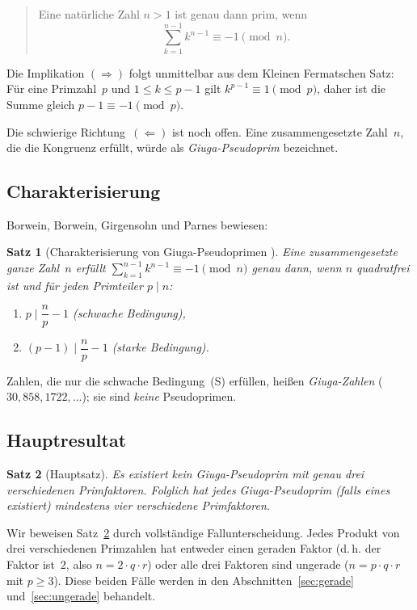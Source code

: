 \documentclass[12pt,a4paper]{amsart}
\newtheorem{theorem}{Satz}[section]
\theoremstyle{definition}
\begin{document}
\begin{quote}
  Eine natürliche Zahl $n > 1$ ist genau dann prim, wenn
  \[
    \sum_{k=1}^{n-1} k^{n-1} \equiv -1 \pmod{n}.
  \]
\end{quote}

Die Implikation $({\Rightarrow})$ folgt unmittelbar aus dem Kleinen Fermatschen Satz:
Für eine Primzahl~$p$ und $1 \le k \le p-1$ gilt $k^{p-1} \equiv 1 \pmod{p}$,
daher ist die Summe gleich $p - 1 \equiv -1 \pmod{p}$.

Die schwierige Richtung~$({\Leftarrow})$ ist noch offen. Eine zusammengesetzte Zahl~$n$,
die die Kongruenz erfüllt, würde als \emph{Giuga-Pseudoprim} bezeichnet.

\subsection{Charakterisierung}

Borwein, Borwein, Girgensohn und Parnes \cite{Borwein1996} bewiesen:

\begin{theorem}[Charakterisierung von Giuga-Pseudoprimen {\cite{Borwein1996}}]
\label{thm:char}
Eine zusammengesetzte ganze Zahl~$n$ erfüllt $\sum_{k=1}^{n-1} k^{n-1} \equiv -1 \pmod{n}$
genau dann, wenn $n$ quadratfrei ist und für jeden Primteiler $p \mid n$:
\begin{enumerate}
  \item[\textup{(S)}] $p \mid \dfrac{n}{p} - 1$  \quad\emph{(schwache Bedingung)},
  \item[\textup{(St)}] $(p-1) \mid \dfrac{n}{p} - 1$ \quad\emph{(starke Bedingung)}.
\end{enumerate}
\end{theorem}

Zahlen, die nur die schwache Bedingung~(S) erfüllen, heißen \emph{Giuga-Zahlen}
($30, 858, 1722, \ldots$); sie sind \emph{keine} Pseudoprimen.

\subsection{Hauptresultat}

\begin{theorem}[Hauptsatz]
\label{thm:haupt}
Es existiert kein Giuga-Pseudoprim mit genau drei verschiedenen Primfaktoren.
Folglich hat jedes Giuga-Pseudoprim (falls eines existiert) mindestens vier
verschiedene Primfaktoren.
\end{theorem}

Wir beweisen Satz~\ref{thm:haupt} durch vollständige Fallunterscheidung.
Jedes Produkt von drei verschiedenen Primzahlen hat entweder einen geraden Faktor
(d.\,h. der Faktor ist~$2$, also $n = 2 \cdot q \cdot r$) oder alle drei Faktoren
sind ungerade ($n = p \cdot q \cdot r$ mit $p \ge 3$). Diese beiden Fälle werden in
den Abschnitten~\ref{sec:gerade} und~\ref{sec:ungerade} behandelt.
\end{document}
